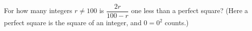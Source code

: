 For how many integers $r\ne100$ is $\dfrac{2r}{100-r}$ one less than a perfect square? (Here a perfect square is the square of an integer, and $0=0^2$ counts.)
